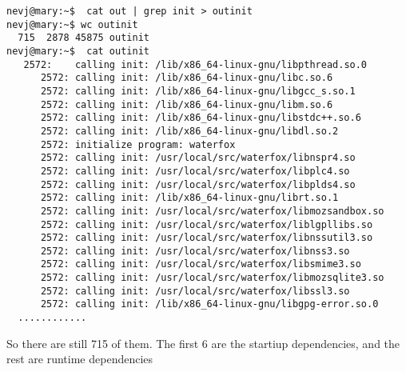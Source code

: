 \documentclass{article}  %
\begin{document}
\begin{verbatim}
nevj@mary:~$  cat out | grep init > outinit
nevj@mary:~$ wc outinit
  715  2878 45875 outinit
nevj@mary:~$  cat outinit
   2572:	calling init: /lib/x86_64-linux-gnu/libpthread.so.0
      2572:	calling init: /lib/x86_64-linux-gnu/libc.so.6
      2572:	calling init: /lib/x86_64-linux-gnu/libgcc_s.so.1
      2572:	calling init: /lib/x86_64-linux-gnu/libm.so.6
      2572:	calling init: /lib/x86_64-linux-gnu/libstdc++.so.6
      2572:	calling init: /lib/x86_64-linux-gnu/libdl.so.2
      2572:	initialize program: waterfox
      2572:	calling init: /usr/local/src/waterfox/libnspr4.so
      2572:	calling init: /usr/local/src/waterfox/libplc4.so
      2572:	calling init: /usr/local/src/waterfox/libplds4.so
      2572:	calling init: /lib/x86_64-linux-gnu/librt.so.1
      2572:	calling init: /usr/local/src/waterfox/libmozsandbox.so
      2572:	calling init: /usr/local/src/waterfox/liblgpllibs.so
      2572:	calling init: /usr/local/src/waterfox/libnssutil3.so
      2572:	calling init: /usr/local/src/waterfox/libnss3.so
      2572:	calling init: /usr/local/src/waterfox/libsmime3.so
      2572:	calling init: /usr/local/src/waterfox/libmozsqlite3.so
      2572:	calling init: /usr/local/src/waterfox/libssl3.so
      2572:	calling init: /lib/x86_64-linux-gnu/libgpg-error.so.0
  ............
\end{verbatim}
  
So there are still 715 of them. The first 6 are the startiup dependencies, and the rest are runtime dependencies
\end{document}
